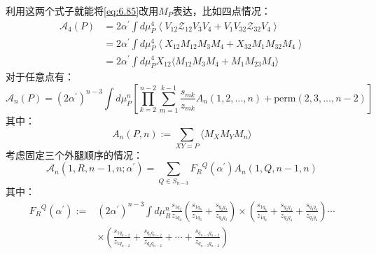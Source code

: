 利用这两个式子就能将\ref{eq:6.85}改用$M_P$表达，比如四点情况：
\begin{equation}
\begin{aligned}
		\mathcal{A}_4(P)&=2\alpha^{\prime}\int d\mu_P^4\left\langle V_{12}\mathcal{Z}_{12}V_3V_4+V_1V_{32}\mathcal{Z}_{32}V_4\right\rangle\\
	&=2\alpha^{\prime}\int d\mu_{P}^{4}\left\langle X_{12}M_{12}M_{3}M_{4}+X_{32}M_{1}M_{32}M_{4}\right\rangle\\
	&=2\alpha^{\prime}\int d\mu_P^4X_{12}\langle M_{12}M_3M_4+M_1M_{23}M_4\rangle
\end{aligned}
\end{equation}
对于任意点有：
\begin{equation}
\boxed{
		\mathcal{A}_n(P)=(2\alpha^{\prime})^{n-3}\int d\mu_P^n\left[\prod_{k=2}^{n-2}\sum_{m=1}^{k-1}\frac{s_{mk}}{z_{mk}}A_n(1,2,\ldots,n)+\mathrm{perm}(2,3,\ldots,n-2)\right]
}
\end{equation}
其中：
\begin{equation}
	\label{eq:6.96}
\boxed{
		A_n(P,n):=\sum_{XY=P}\langle M_XM_YM_n\rangle
}
\end{equation}
考虑固定三个外腿顺序的情况：
\begin{equation}
	\mathcal{A}_n(1,R,n-1,n;\alpha^{\prime})=\sum_{{Q}\in S_{n-3}}{{F}_R}^{Q}(\alpha^{\prime})A_n(1,{Q},n-1,n)
\end{equation}
其中：
\begin{equation}
\begin{aligned}
	\label{eq:6.98}
		{F_R}^Q(\alpha^{\prime}):=&(2\alpha^{\prime})^{n-3}\int d\mu_R^n\frac{s_{1q_2}}{z_{1q_2}}\left(\frac{s_{1q_3}}{z_{1q_3}}+\frac{s_{q_2q_3}}{z_{q_2q_3}}\right)
	\times\left(\frac{s_{1q_4}}{z_{1q_4}}+\frac{s_{q_2q_4}}{z_{q_2q_4}}+\frac{s_{q_3q_4}}{z_{q_3q_4}}\right)\cdots\\
	&\times\left(\frac{s_{1q_{n-2}}}{z_{1q_{n-2}}}+\frac{s_{q_2q_{n-2}}}{z_{q_2q_{n-2}}}+\cdots+\frac{s_{q_{n-3}q_{n-2}}}{z_{q_{n-3}q_{n-2}}}\right)
\end{aligned}
\end{equation}
